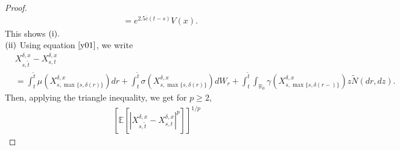 \documentclass[11pt]{article}
\theoremstyle{theorem}
\theoremstyle{definition}
\newcommand{\bR}{\mathbb{R}}
\newcommand{\1}{{\bf 1}}
\begin{document}
\begin{proof}
\begin{align*}
& = e^{2.5 \overline{c}(t-s)}V(x).
\end{align*}
This shows $\textup{(i)}.$\\
$\textup{(ii)}$ Using equation $\eqref{y01}$, we write
  \begin{align*}
 &  X^{\delta, x}_{s,\widetilde{t}}-X^{\delta, x}_{s,t} \\
 &= \int_t^{\widetilde{t}} \mu(X_{s,\max\{s,\delta(r)\}}^{\delta,x}) dr + \int_t^{\widetilde{t}} \sigma(X_{s,\max\{s,\delta(r)\}}^{\delta,x}) dW_r + \int_t^{\widetilde{t}} \int _{\bR_0}\gamma (X_{s,\max\{s,\delta(r-)\}}^{\delta,x}) z \widetilde{N}(dr, dz).
  \end{align*} 
  Then, applying the triangle inequality, we get for $p \ge 2,$
\begin{align} 
\label{Lem3.3.1}
\left[\mathbb{E}\left[\left|X^{\delta, x}_{s,\widetilde{t}}-X^{\delta, x}_{s,t}\right|^p\right]\right]^{1/p} 

\end{align}
\end{proof}
\end{document}
